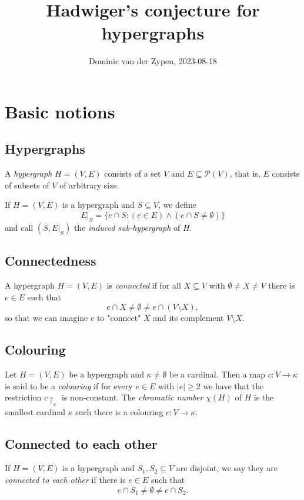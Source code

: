 \documentclass[12pt, a4paper]{amsart}
\begin{document}
\title{Hadwiger's conjecture for hypergraphs}
\author{Dominic van der Zypen, 2023-08-18}
\maketitle
\thispagestyle{empty}
\section{Basic notions}
\subsection{Hypergraphs} A {\em hypergraph} $H=(V,E)$ consists of a
set $V$ and $E\subseteq {\mathcal P}(V)$, that is, $E$ 
consists of subsets of $V$ of arbitrary size. 

If $H = (V,E)$ is a hypergraph and $S\subseteq V$, we define
$$E|_S = \{e\cap S: (e\in E) \land (e\cap S \neq \emptyset)\}$$
and call $(S, E|_S)$ the {\em induced sub-hypergraph} of $H$.


\subsection{Connectedness} A hypergraph $H=(V,E)$ is {\em connected}
if for all $X \subseteq V$ with $\emptyset \neq X \neq V$ there
is $e\in E$ such that $$e\cap X \neq \emptyset \neq e
\cap (V\setminus X),$$
so that we can imagine $e$ to "connect" $X$ and its complement $V\setminus X$.

\subsection{Colouring} Let $H=(V,E)$ be a hypergraph and 
$\kappa\neq \emptyset$ be a cardinal.
Then a map $c:V\to \kappa$ is said to be a {\em colouring} if for
every $e\in E$ with $|e|\geq 2$ we have that
the restriction $c\restriction_e$ is non-constant. The {\em chromatic
number} $\chi(H)$ of $H$ is the smallest cardinal $\kappa$ such there
is a colouring $c:V\to \kappa$.

\subsection{Connected to each other} If $H=(V,E)$ is a hypergraph
and $S_1, S_2\subseteq V$ are disjoint, we say they are {\em connected
to each other} if there is $e\in E$ such that $$e\cap S_1 \neq \emptyset
\neq e\cap S_2.$$
\end{document}
